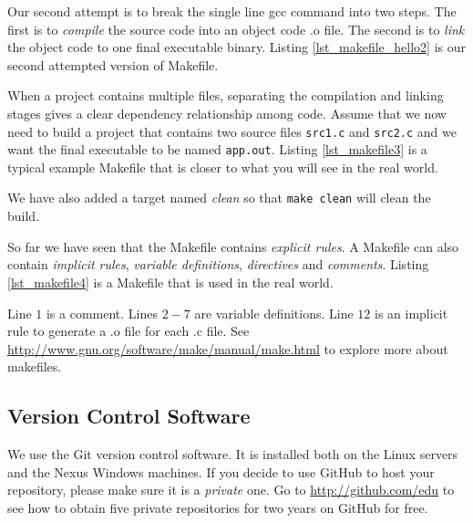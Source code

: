 Our second attempt is to break the single line gcc command into two steps. The first is to {\em compile} the source code into an object code .o file. The second is to {\em link} the object code to one final executable binary. 
Listing \ref{lst_makefile_hello2} is our second attempted  version of Makefile.



When a project contains multiple files, separating the compilation and linking stages gives a clear dependency relationship among code. Assume that we now need to build a project that contains two source files \verb+src1.c+ and \verb+src2.c+ and we want the final executable to be named \verb+app.out+.
Listing \ref{lst_makefile3} is a typical example Makefile that is closer to what you will see in the real world.

We have also added a target named {\em clean} so that \verb+make clean+ will clean the build.

So far we have seen that the Makefile contains {\em explicit rules}. A Makefile can also contain {\em implicit rules}, {\em variable definitions}, {\em directives} and
{\em comments}. 
Listing \ref{lst_makefile4} is a Makefile that is used in the real world.

Line $1$ is a comment. Lines $2-7$ are variable definitions. Line $12$ is an implicit rule to generate a .o file for each .c file. 
See \url{http://www.gnu.org/software/make/manual/make.html} to explore more about makefiles.

\subsection{Version Control Software}
We use the Git version control software. It is installed both on the Linux servers and the Nexus Windows machines. If you decide to use GitHub to host your repository, please make sure it is a {\em private} one. Go to \url{http://github.com/edu} to see how to obtain five private repositories for two years on GitHub for free. 

